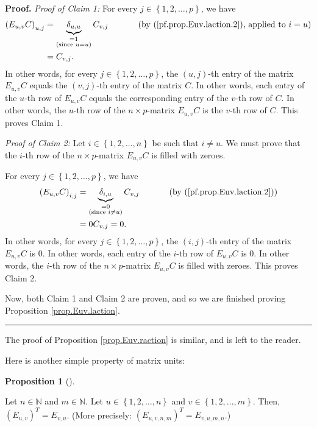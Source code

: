 \documentclass[numbers=enddot,12pt,final,onecolumn,notitlepage]{scrartcl}%
\theoremstyle{definition}
\newtheorem{prop}[theo]{Proposition}
\newenvironment{proposition}[1][]
{\begin{prop}[#1]\begin{leftbar}}
{\end{leftbar}\end{prop}}
\newenvironment{proof}[1][Proof]{\noindent\textbf{#1.} }{\ \rule{0.5em}{0.5em}}
\begin{document}
\begin{proof}
\textit{Proof of Claim 1:} For every $j\in\left\{  1,2,\ldots,p\right\}  $, we
have%
\begin{align*}
\left(  E_{u,v}C\right)  _{u,j}  &  =\underbrace{\delta_{u,u}}%
_{\substack{=1\\\text{(since }u=u\text{)}}}C_{v,j}\ \ \ \ \ \ \ \ \ \ \left(
\text{by (\ref{pf.prop.Euv.laction.2}), applied to }i=u\right) \\
&  =C_{v,j}.
\end{align*}
In other words, for every $j\in\left\{  1,2,\ldots,p\right\}  $, the $\left(
u,j\right)  $-th entry of the matrix $E_{u,v}C$ equals the $\left(
v,j\right)  $-th entry of the matrix $C$. In other words, each entry of the
$u$-th row of $E_{u,v}C$ equals the corresponding entry of the $v$-th row of
$C$. In other words, the $u$-th row of the $n\times p$-matrix $E_{u,v}C$ is
the $v$-th row of $C$. This proves Claim 1.

\textit{Proof of Claim 2:} Let $i\in\left\{  1,2,\ldots,n\right\}  $ be such
that $i\neq u$. We must prove that the $i$-th row of the $n\times p$-matrix
$E_{u,v}C$ is filled with zeroes.

For every $j\in\left\{  1,2,\ldots,p\right\}  $, we have%
\begin{align*}
\left(  E_{u,v}C\right)  _{i,j}  &  =\underbrace{\delta_{i,u}}%
_{\substack{=0\\\text{(since }i\neq u\text{)}}}C_{v,j}%
\ \ \ \ \ \ \ \ \ \ \left(  \text{by (\ref{pf.prop.Euv.laction.2})}\right) \\
&  =0C_{v,j}=0.
\end{align*}
In other words, for every $j\in\left\{  1,2,\ldots,p\right\}  $, the $\left(
i,j\right)  $-th entry of the matrix $E_{u,v}C$ is $0$. In other words, each
entry of the $i$-th row of $E_{u,v}C$ is $0$. In other words, the $i$-th row
of the $n\times p$-matrix $E_{u,v}C$ is filled with zeroes. This proves Claim 2.

Now, both Claim 1 and Claim 2 are proven, and so we are finished proving
Proposition \ref{prop.Euv.laction}.
\end{proof}

The proof of Proposition \ref{prop.Euv.raction} is similar, and is left to the reader.

Here is another simple property of matrix units:

\begin{proposition}
\label{prop.Euv.transpose}Let $n\in\mathbb{N}$ and $m\in\mathbb{N}$. Let
$u\in\left\{  1,2,\ldots,n\right\}  $ and $v\in\left\{  1,2,\ldots,m\right\}
$. Then, $\left(  E_{u,v}\right)  ^{T}=E_{v,u}$. (More precisely: $\left(
E_{u,v,n,m}\right)  ^{T}=E_{v,u,m,n}$.)
\end{proposition}
\end{document}
